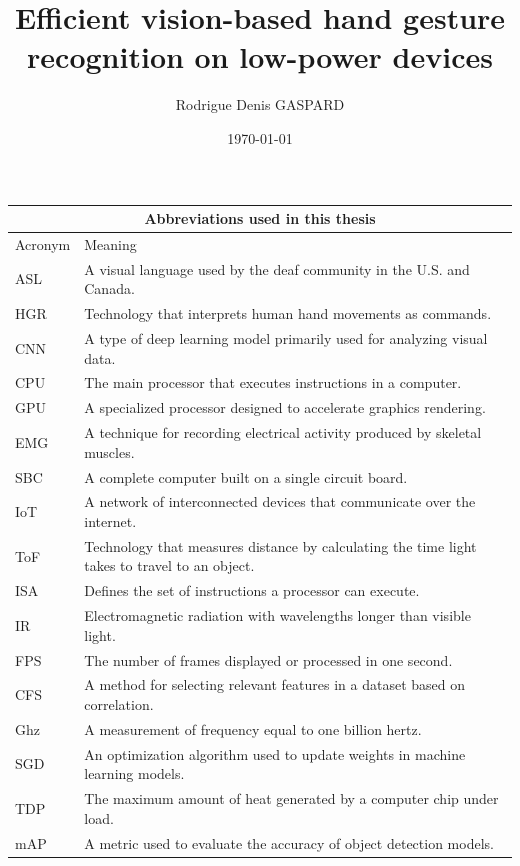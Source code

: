 \documentclass[12pt]{article}
\title{Efficient vision-based hand gesture recognition on low-power devices}
\author{Rodrigue Denis GASPARD}
\affil{Master of Computer Science \\ UniKL \\ MIIT Campus}
\date{\today}
\begin{document}
\maketitle

\clearpage

\tableofcontents

\clearpage

\begin{table}
  \centering
  \begin{tabular}{ |p{3cm}|p{8cm}|  }
    \hline
    \multicolumn{2}{|c|}{Abbreviations used in this thesis} \\
    \hline
    Acronym & Meaning \\
    \hline
    ASL & A visual language used by the deaf community in the U.S. and Canada.\\
    HGR & Technology that interprets human hand movements as commands. \\  
    CNN & A type of deep learning model primarily used for analyzing visual data. \\
    CPU & The main processor that executes instructions in a computer. \\
    GPU & A specialized processor designed to accelerate graphics rendering. \\
    EMG & A technique for recording electrical activity produced by skeletal muscles. \\
    SBC & A complete computer built on a single circuit board. \\
    IoT & A network of interconnected devices that communicate over the internet. \\
    ToF & Technology that measures distance by calculating the time light takes to travel to an object. \\
    ISA & Defines the set of instructions a processor can execute. \\
    IR  & Electromagnetic radiation with wavelengths longer than visible light. \\
    FPS & The number of frames displayed or processed in one second. \\
    CFS & A method for selecting relevant features in a dataset based on correlation. \\
    Ghz & A measurement of frequency equal to one billion hertz. \\
    SGD & An optimization algorithm used to update weights in machine learning models. \\
    TDP & The maximum amount of heat generated by a computer chip under load. \\
    mAP & A metric used to evaluate the accuracy of object detection models. \\
    \hline
  \end{tabular}
\end{table}
\end{document}
